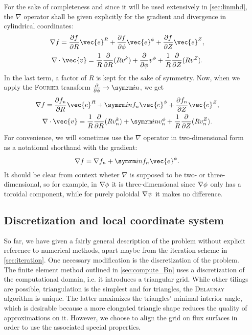 For the sake of completeness and since it will be used extensively in \cref{sec:linmhd}, the $\nabla$ operator shall be given explicitly for the gradient and divergence in cylindrical coordinates:
\begin{gather}
  \grad f = \pd[f]{R} \vec{e}^{R} + \pd[f]{\phi} \vec{e}^{\phi} + \pd[f]{Z} \vec{e}^{Z}, \\
  \divg \vec{v} = \frac{1}{R} \pd{R} (R v^{k}) + \pd{\phi} v^{\phi} + \frac{1}{R} \pd{Z} (R v^{Z}).
\end{gather}
In the last term, a factor of $R$ is kept for the sake of symmetry. Now, when we apply the \textsc{Fourier} transform $\pd{\phi} \to \im n$, we get
\begin{gather}
  \grad f = \pd[f_{n}]{R} \vec{e}^{R} + \im n f_{n} \vec{e}^{\phi} + \pd[f_{n}]{Z} \vec{e}^{Z}, \\
  \divg \vec{v} = \frac{1}{R} \pd{R} (R v_{n}^{k}) + \im n v_{n}^{\phi} + \frac{1}{R} \pd{Z} (R v_{n}^{Z}).
\end{gather}
For convenience, we will sometimes use the $\nabla$ operator in two-dimensional form as a notational shorthand with the gradient:
\begin{gather}
  \grad f = \grad f_{n} + \im n f_{n} \vec{e}^{\phi}.
\end{gather}
It should be clear from context wheter $\nabla$ is supposed to be two- or three-dimensional, so for example, in $\grad \phi$ it is three-dimensional since $\grad \phi$ only has a toroidal component, while for purely poloidal $\nabla \psi$ it makes no difference.

\subsection{Discretization and local coordinate system}
\label{sec:grid}

So far, we have given a fairly general description of the problem without explicit reference to numerical methods, apart maybe from the iteration scheme in \cref{sec:iteration}. One necessary modification is the discretization of the problem. The finite element method outlined in \cref{sec:compute_Bn} uses a discretization of the computational domain, i.e. it introduces a triangular grid. While other tilings are possible, triangulation is the simplest and for triangles, the \textsc{Delaunay} algorithm is unique. The latter maximizes the triangles' minimal interior angle, which is desirable because a more elongated triangle shape reduces the quality of approximations on it. However, we choose to align the grid on flux surfaces in order to use the associated special properties.

